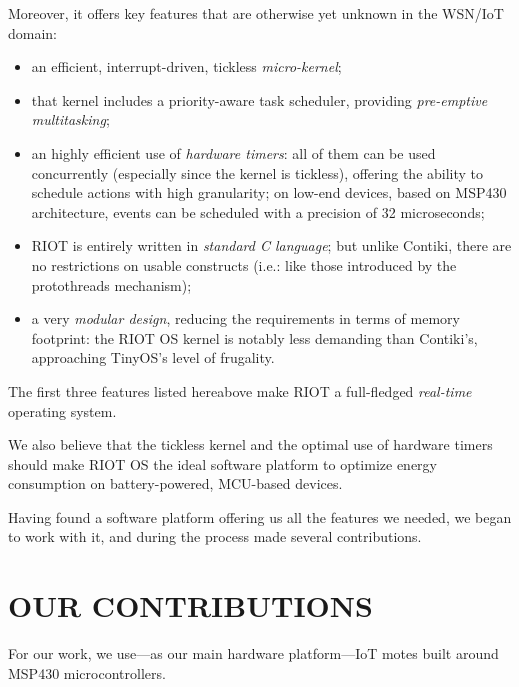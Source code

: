 \documentclass[a4paper,twoside]{article}
\begin{document}
Moreover, it offers key features that are otherwise yet unknown in
the WSN/IoT domain:

\begin{itemize}

\item an efficient, interrupt-driven, tickless \emph{micro-kernel};

\item that kernel includes a priority-aware task scheduler, providing
      \emph{pre-emptive multitasking};

\item an highly efficient use of \emph{hardware timers}: all of them can be
      used concurrently (especially since the kernel is tickless), offering
      the ability to schedule actions with high granularity; on low-end
      devices, based on MSP430 architecture, events can be scheduled
      with a precision of 32 microseconds;

\item RIOT is entirely written in \emph{standard C language}; but unlike
      Contiki, there are no restrictions on usable constructs (i.e.: like
      those introduced by the protothreads mechanism);

\item a very \emph{modular design}, reducing the requirements in terms
      of memory footprint: the RIOT OS kernel is notably less demanding than
      Contiki's, approaching TinyOS's level of frugality.

\end{itemize}

The first three features listed hereabove make RIOT a full-fledged
\emph{real-time} operating system.

We also believe that the tickless kernel and the optimal use of hardware
timers should make RIOT OS the ideal software platform to optimize energy
consumption on battery-powered, MCU-based devices.

Having found a software platform offering us all the features we needed,
we began to work with it, and during the process made several contributions.


\section{\uppercase{Our contributions}}

For our work, we use---as our main hardware platform---IoT motes built
around MSP430 microcontrollers.
\end{document}
